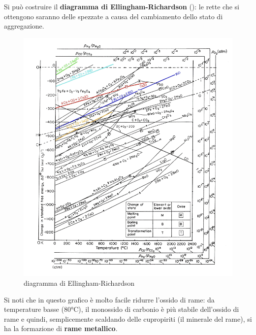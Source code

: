 Si può costruire il \textbf{diagramma di Ellingham-Richardson} (): le rette che si ottengono saranno delle spezzate a causa del cambiamento dello stato di aggregazione.
\begin{figure}[!hbt]
    \includegraphics[width=1\textwidth]{images/img24.png}
    \caption{diagramma di Ellingham-Richardson}
\end{figure}

Si noti che in questo grafico è molto facile ridurre l’ossido di rame: da temperature basse (80°C), il monossido di carbonio è più stabile dell’ossido di rame e quindi, semplicemente scaldando delle cupropiriti (il minerale del rame), si ha la formazione di \textbf{rame metallico}.

